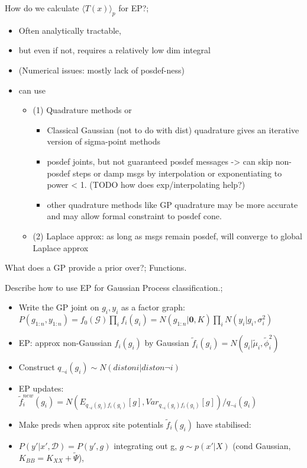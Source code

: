 \documentclass{article}
\begin{document}
How do we calculate $\langle T(x) \rangle_p$ for EP?; \begin{itemize}
    \item Often analytically tractable, 
    \item but even if not, requires a relatively low dim integral 
    \item (Numerical issues: mostly lack of posdef-ness)
    \item can use \begin{itemize}
        \item (1) Quadrature methods or 
        \begin{itemize}
            \item Classical Gaussian (not to do with dist) quadrature gives an iterative version of sigma-point methods
            \item posdef joints, but not guaranteed posdef messages -> can skip non-posdef steps or damp msgs by interpolation or exponentiating to power < 1. (TODO how does exp/interpolating help?)
            \item other quadrature methods like GP quadrature may be more accurate and  may allow formal constraint to posdef cone.
        \end{itemize}
        \item (2) Laplace approx: as long as msgs remain posdef, will converge to global Laplace approx
    \end{itemize}
\end{itemize}

What does a GP provide a prior over?; Functions.

Describe how to use EP for Gaussian Process classification.; \begin{itemize}
    \item Write the GP joint on $g_i, y_i$ as a factor graph: $P(g_{1:n}, y_{1:n}) = f_0(\mathcal{G})\prod_i f_i(g_i) = N(g_{1:n}|\mathbf{0}, K) \prod_i N(y_i|g_i, \sigma^2_i)$
    \item EP: approx non-Gaussian $f_i(g_i)$ by Gaussian $\tilde{f}_i(g_i) = N(g_i | \tilde{\mu}_i, \tilde{\phi}^2_i)$
    \item Construct $q_{\neg i}(g_i) \sim N(dist on i | dist on \neg i)$
    \item EP updates: $\tilde{f}_i^{new}(g_i) = N(E_{q_{\neg i}(g_i)f_i(g_i)}[g], Var_{q_{\neg i}(g_i)f_i(g_i)}[g])/q_{\neg i}(g_i)$
    \item Make preds when approx site potentials $\tilde{f}_i(g_i)$ have stabilised: 
    \item $P(y'|x', \mathcal{D}) = P(y', g)$ integrating out g, $g\sim p(x'|X)$ (cond Gaussian, $K_{BB} = K_{XX} + \tilde{\Psi}$),  
\end{itemize}
\end{document}
